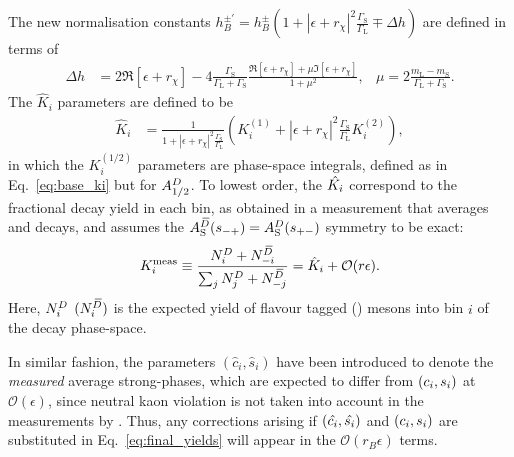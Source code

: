 The new normalisation constants $h_B^{\pm'}=h_B^{\pm}(1+|\epsilon+r_\chi|^2\frac{\Gamma_\text{S}}{\Gamma_\text{L}}\mp\Delta h)$ are defined in terms of
\begin{align}
        \Delta h &= 2\Re[\epsilon+r_\chi] 
    -4\frac{\Gamma_\text{S}}{\Gamma_\text{L}+\Gamma_\text{S}}\frac{\Re[\epsilon+r_\chi] + \mu \Im[\epsilon+r_\chi] }
    {1+\mu^2}, &
    \mu = 2 \frac{m_\text{L}-m_\text{S}}{\Gamma_\text{L}+\Gamma_\text{S}}.
\end{align}
The $\hat K_i$ parameters are defined to be
\begin{align}\label{eq:hat_Ki}
\hat K_i &= \frac{1}{1+|\epsilon+r_\chi|^2\frac{\Gamma_\text{S}}{\Gamma_\text{L}}}\left(K_i^{(1)}+|\epsilon+r_\chi|^2\frac{\Gamma_\text{S}}{\Gamma_\text{L}}K_i^{(2)}\right),
\end{align}
in which the $K^{(1/2)}_i$ parameters are phase-space integrals, defined as in Eq.~\eqref{eq:base_ki} but for $A^{D}_{1/2}$. To lowest order, the $\hat {K_i}$ correspond to the fractional \Dz decay yield in each bin, as obtained in a measurement that averages \Dz and \Dzb decays, and assumes the $A_{\rm S}^{{\kern 0.18em\overline{\kern -0.18em D}}}(s_{-+})=A_{\rm S}^{D}(s_{+-})$ symmetry to be exact:
\begin{align}\label{eq:K_meas}
  K_i^\text{meas}\equiv \frac{{N^{D}_i + N^{\kern 0.18em\overline{\kern -0.18em D}}_{-i}}}{{\sum_j N^{D}_j +N^{\kern 0.18em\overline{\kern -0.18em D}}_{-j}}} = \hat K_i + \mathcal O(r\epsilon).
 \end{align}Here, $N^{D}_i$ $(N^{\kern 0.18em\overline{\kern -0.18em D}}_i)$ is the expected yield of flavour tagged \Dz (\Dzb) mesons into bin $i$ of the \D decay phase-space. 

In similar fashion, the parameters $(\hat c_i, \hat s_i)$ have been introduced to denote the \emph{measured} average strong-phases, which are expected to differ from $(c_i,s_i)$ at $\mathcal O(\epsilon)$, since neutral kaon \CP violation is not taken into account in the measurements by \cleo. Thus, any corrections arising if $(\hat {c_i}, \hat {s_i})$ and $(c_i, s_i)$ are substituted in Eq.~\eqref{eq:final_yields} will appear in the $\mathcal O(r_B\epsilon)$ terms.



